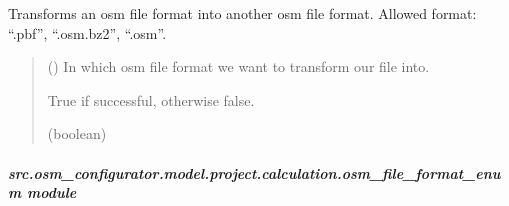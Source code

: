 \documentclass[letterpaper,10pt,english]{sphinxmanual}
\begin{document}
\begin{fulllineitems}
\begin{fulllineitems}
\label{\detokenize{apidoc/src.osm_configurator.model.project.calculation:src.osm_configurator.model.project.calculation.osm_file_converter.OSMFileConverter.convert_file}}
\pysigstartsignatures
{}
\pysigstopsignatures
\sphinxAtStartPar
Transforms an osm file format into another osm file format.
Allowed format: “.pbf”, “.osm.bz2”, “.osm”.
\begin{quote}\begin{description}
\sphinxAtStartPar
{} ({\hyperref[\detokenize{apidoc/src.osm_configurator.model.project.calculation:src.osm_configurator.model.project.calculation.osm_file_format_enum.OSMFileFormat}]{}}) \textendash{} In which osm file format we want to transform our file into.

\sphinxAtStartPar
True if successful, otherwise false.

\sphinxAtStartPar
(boolean)

\end{description}\end{quote}

\end{fulllineitems}


\end{fulllineitems}



\subparagraph{src.osm\_configurator.model.project.calculation.osm\_file\_format\_enum module}
\label{\detokenize{apidoc/src.osm_configurator.model.project.calculation:module-src.osm_configurator.model.project.calculation.osm_file_format_enum}}\label{\detokenize{apidoc/src.osm_configurator.model.project.calculation:src-osm-configurator-model-project-calculation-osm-file-format-enum-module}}
\end{document}
